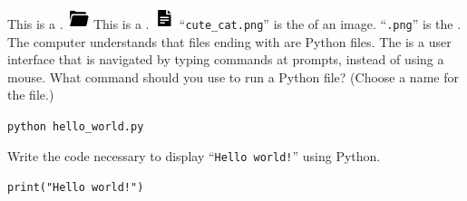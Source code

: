 \documentclass[a4paper,answers,addpoints]{exam}
\begin{document}
\vspace{20pt}
\begin{questions}
    \question[2] This is a \fillin[file].
    \includegraphics[width=24px]{folder.png}
    \question[2] This is a \fillin[folder].
    \includegraphics[width=24px]{file.png}
    \question[4] ``\texttt{cute\_cat.png}'' is the \fillin[filename] of an image. ``\texttt{.png}'' is the .
    \question[2] The computer understands that files ending with \fillin[\texttt{.py}] are Python files.
    \question[2] The  is a user interface that is navigated by typing commands at prompts, instead of using a mouse.
    \question[5] What command should you use to run a Python file? (Choose a name for the file.)
    \begin{solutionorlines}[50pt]
        \texttt{python hello\_world.py}
    \end{solutionorlines}
    \question[5] Write the code necessary to display ``\texttt{Hello world!}'' using Python.
    \begin{solutionorlines}[50pt]
    \texttt{print("Hello world!")}
    \end{solutionorlines}
\end{questions}
\vspace{35pt}
\begin{center}
    \gradetable[h][questions]
\end{center}
\end{document}
